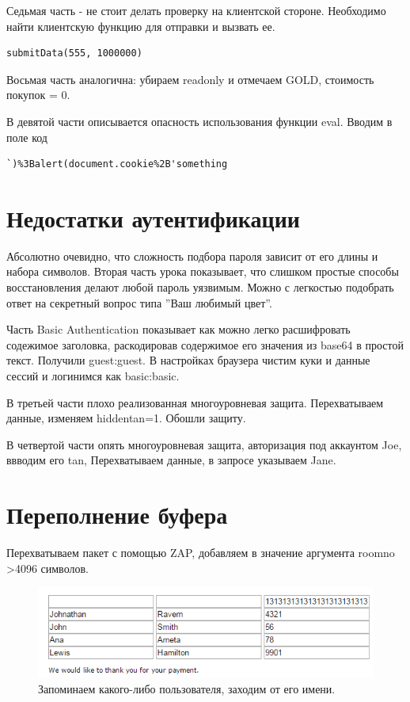 \documentclass[utf8x, 12pt]{G7-32}
\begin{document}
Седьмая часть - не стоит делать проверку на клиентской стороне. Необходимо найти клиентскую функцию для отправки и вызвать ее.
\begin{lstlisting}
submitData(555, 1000000)
\end{lstlisting}

Восьмая часть аналогична: убираем readonly и отмечаем GOLD, стоимость покупок = 0.

В девятой части описывается опасность использования функции eval. Вводим в поле код
\begin{lstlisting}
`)%3Balert(document.cookie%2B'something
\end{lstlisting}


\newpage
\section{Недостатки аутентификации}

Абсолютно очевидно, что сложность подбора пароля зависит от его длины и набора символов.
Вторая часть урока показывает, что слишком простые способы восстановления делают любой пароль уязвимым. Можно с легкостью подобрать ответ на секретный вопрос типа ''Ваш любимый цвет''.

Часть Basic Authentication показывает как можно легко расшифровать содежимое заголовка, раскодировав содержимое его значения из base64 в простой текст. Получили guest:guest. В настройках браузера чистим куки и данные сессий и логинимся как basic:basic.

В третьей части плохо реализованная многоуровневая защита. Перехватываем данные, изменяем hiddentan=1. Обошли защиту.

В четвертой части опять многоуровневая защита, авторизация под аккаунтом Joe, ввводим его tan, Перехватываем данные, в запросе указываем Jane.

\section{Переполнение буфера}
Перехватываем пакет с помощью ZAP, добавляем в значение аргумента roomno >4096 символов.
\begin{figure}[h!]
\centering
\includegraphics[width=\textwidth]{rsrc/6_1}
\caption{Запоминаем какого-либо пользователя, заходим от его имени.}
\end{figure}
\end{document}
